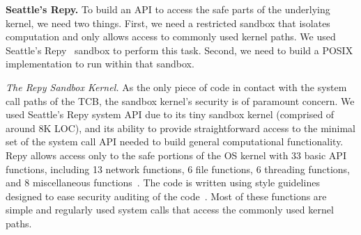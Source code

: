 %

\textbf{Seattle's Repy.}
To build an API to access the safe parts of the underlying kernel, we need
two things. First, we need a restricted sandbox that isolates computation
and only allows access to commonly used kernel paths.  We used
Seattle's Repy~\cite{Repy-10} sandbox to perform this task.
Second, we need to build a POSIX implementation to run within that sandbox.

\textit{The Repy Sandbox Kernel.}
As the only piece of code in contact with the system call paths of the TCB,
the sandbox kernel's security is of paramount concern.
We used Seattle's Repy system API due to its tiny sandbox kernel
(comprised of around 8K LOC), and its ability to provide straightforward
access to the minimal set of the system call API needed to build general
computational functionality. Repy allows
access only to the safe portions of the OS kernel with 33 basic API
functions, including 13 network functions, 6 file functions, 6 threading functions,
and 8 miscellaneous functions~\cite{Repy-10, RepyKernel}. The code is
written using style guidelines designed to ease security auditing
 of the code~\cite{style}. Most of these functions are simple and
regularly used system calls that access the commonly used kernel paths.


